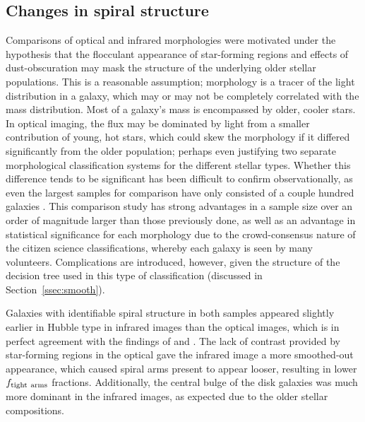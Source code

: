 \subsection{Changes in spiral structure}

Comparisons of optical and infrared morphologies were motivated under the hypothesis that the flocculant appearance of star-forming regions and effects of dust-obscuration may mask the structure of the underlying older stellar populations. This is a reasonable assumption; morphology is a tracer of the light distribution in a galaxy, which may or may not be completely correlated with the mass distribution. Most of a galaxy's mass is encompassed by older, cooler stars. In optical imaging, the flux may be dominated by light from a smaller contribution of young, hot stars, which could skew the morphology if it differed significantly from the older population; perhaps even justifying two separate morphological classification systems for the different stellar types. Whether this difference tends to be significant has been difficult to confirm observationally, as even the largest samples for comparison have only consisted of a couple hundred galaxies \citep{Eskridge2002,Buta2010}. This comparison study has strong advantages in a sample size over an order of magnitude larger than those previously done, as well as an advantage in statistical significance for each morphology due to the crowd-consensus nature of the citizen science classifications, whereby each galaxy is seen by many volunteers. Complications are introduced, however, given the structure of the decision tree used in this type of classification (discussed in Section~\ref{ssec:smooth}).
 
Galaxies with identifiable spiral structure in both samples appeared slightly earlier in Hubble type in infrared images than the optical images, which is in perfect agreement with the findings of \citet{Eskridge2002} and \citet{Buta2010}. The lack of contrast provided by star-forming regions in the optical gave the infrared image a more smoothed-out appearance, which caused spiral arms present to appear looser, resulting in lower $f_{\rm tight~arms}$ fractions. Additionally, the central bulge of the disk galaxies was much more dominant in the infrared images, as expected due to the older stellar compositions. 

